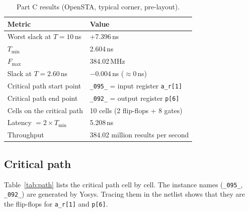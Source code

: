 \documentclass[10pt,a4paper,twocolumn]{article}
\newcommand{\Tmin}{$T_{\min}$}
\newcommand{\Fmax}{$F_{\max}$}
\begin{document}
\begin{table}[!htbp]
\centering\footnotesize
\begin{tabularx}{\columnwidth}{>{\raggedright\arraybackslash}p{3.3cm}L}
\toprule
\textbf{Metric} & \textbf{Value} \\
\midrule
Worst slack at $T = 10$\,ns & +7.396\,ns \\
\Tmin & 2.604\,ns \\
\Fmax & 384.02\,MHz \\
Slack at $T = 2.60$\,ns & $-0.004$\,ns ($\approx 0$\,ns) \\
Critical path start point & \texttt{\_095\_} = input register \texttt{a\_r[1]} \\
Critical path end point & \texttt{\_092\_} = output register \texttt{p[6]} \\
Cells on the critical path & 10 cells (2 flip-flops + 8 gates) \\
Latency $= 2 \times T_{\min}$ & 5.208\,ns \\
Throughput & 384.02 million results per second \\
\bottomrule
\end{tabularx}
\caption{Part C results (OpenSTA, typical corner, pre-layout).}
\label{tab:partC}
\end{table}

\subsection{Critical path}
Table~\ref{tab:path} lists the critical path cell by cell. The instance names (\texttt{\_095\_}, \texttt{\_092\_}) are generated by Yosys. Tracing them in the netlist shows that they are the flip-flops for \texttt{a\_r[1]} and \texttt{p[6]}.
\end{document}
